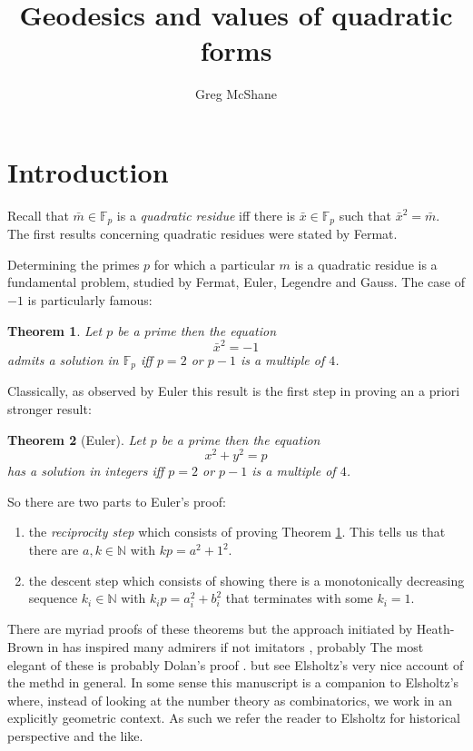 \documentclass[12pt,a4paper]{amsart}
\title{Geodesics and values of quadratic forms}
\author[McShane]{Greg McShane}
\newtheorem{thm}{Theorem}[section]
\def\GG{\mathbb{G}}
\def\fp{\mathbb{F}_p}
\begin{document}
\maketitle

\section{Introduction}


Recall
that $\bar{m}\in \fp$ is a \textit{quadratic residue} iff
there is $\bar{x}\in \fp $ such that $\bar{x}^2 = \bar{m}$.
The first results concerning quadratic residues were stated by
Fermat. 

Determining the primes $p$ for which a particular $m$ is a quadratic
residue is a fundamental problem, studied by Fermat, Euler, Legendre
and Gauss. The case of $-1$ is particularly famous:

\begin{thm}\label{triv}
Let $p$ be a prime then the equation
$$\bar{x}^2 = -1$$
admits a solution in $\fp$ iff 
$p =2$ or $p-1$ is a multiple of $4$.
\end{thm}

Classically, as observed by Euler this result is the first step in proving an a priori stronger result:


\begin{thm}[Euler]\label{main}
Let $p$ be a prime then the equation
$$x^2 + y^2 = p $$
has a solution in integers  iff  $p =2$ or $p-1$ is a multiple of $4$.
\end{thm}

\noindent
So there are two parts to Euler's proof:
\begin{enumerate}
	\item the \textit{reciprocity step} which consists of
		proving Theorem \ref{triv}. This tells us
		that there are $a,k \in \mathbb{N}$ with $kp = a^2 +1^2$.
	\item the {descent step} which consists of showing
		there is a  monotonically decreasing sequence
		$k_i \in \mathbb{N}$ with $k_ip = a_i^2 +b_i^2$
		that terminates with some $k_i=1$.
\end{enumerate}

There are myriad proofs of these theorems but the approach initiated
by Heath-Brown in \cite{heath} has inspired many admirers if not
imitators \cite{generalov, jackson,northshield, dubach}, probably
The most elegant of these is probably Dolan's proof \cite{dolan}.
but see Elsholtz's very nice account \cite{elsholtz} of the methd in
general. In some sense this manuscript is a companion to Elsholtz's
where, instead of looking at the number theory as combinatorics, we
work in an explicitly geometric context. As such we refer the reader
to Elsholtz for historical perspective and the like. 
\end{document}
